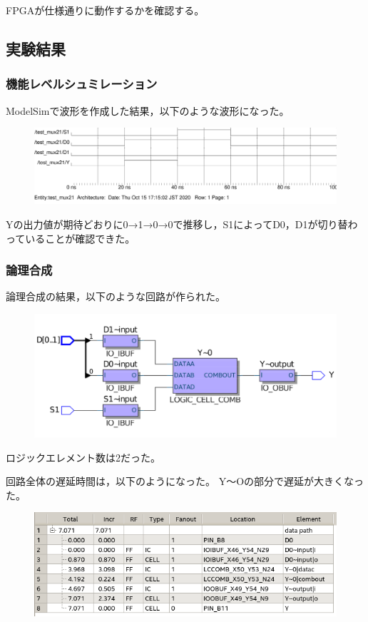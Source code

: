 FPGAが仕様通りに動作するかを確認する。

\subsection{実験結果}
\subsubsection{機能レベルシュミレーション}
ModelSimで波形を作成した結果，以下のような波形になった。

\begin{figure}[H]
  \centering
  \includegraphics[width=\linewidth]{./src/mux21/mux21_wave11.png}
\end{figure}

Yの出力値が期待どおりに0→1→0→0で推移し，S1によってD0，D1が切り替わっていることが確認できた。

\subsubsection{論理合成}
論理合成の結果，以下のような回路が作られた。

\begin{figure}[H]
  \centering
  \includegraphics[width=\linewidth]{./src/mux21/mux21_print.png}
\end{figure}

ロジックエレメント数は2だった。

回路全体の遅延時間は，以下のようになった。
Y～Oの部分で遅延が大きくなった。

\begin{figure}[H]
  \centering
  \includegraphics[width=\linewidth]{./src/mux21/mux21Timing.png}
\end{figure}

